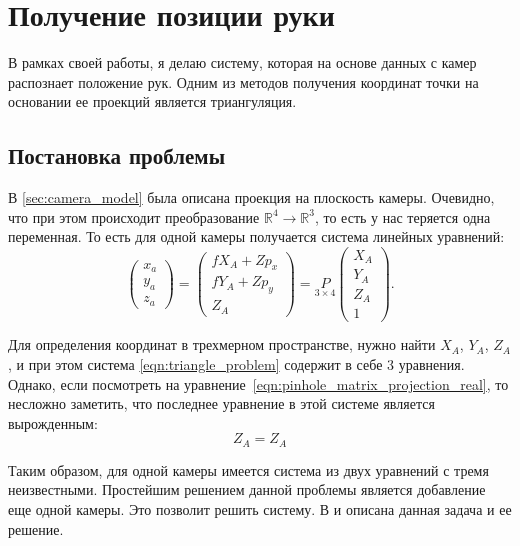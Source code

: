 \documentclass[12pt, a4paper]{article}
\begin{document}
\section{Получение позиции руки}
В рамках своей работы, я делаю систему, которая на основе данных с камер
распознает положение рук. Одним из методов получения координат точки на
основании ее проекций является триангуляция. \subsection{Постановка проблемы} В
\ref{sec:camera_model} была описана проекция на плоскость камеры. Очевидно, что
при этом происходит преобразование $\mathbb{R}^4 \rightarrow \mathbb{R}^3$, то
есть у нас теряется одна переменная. То есть для одной камеры получается
система линейных уравнений:
\begin{equation}
    \begin{pmatrix}
        x_a\\
        y_a\\
        z_a
    \end{pmatrix} = \begin{pmatrix}
        f X_A + Z p_x\\
        f Y_A + Z p_y\\
        Z_A 
    \end{pmatrix} = \underset{3 \times 4}{P} \begin{pmatrix}
        X_A\\
        Y_A\\
        Z_A\\
        1
    \end{pmatrix}.
\label{eqn:triangle_problem}
\end{equation}

Для определения координат в трехмерном пространстве, нужно найти $X_A$, $Y_A$,
$Z_A$, и при этом система \eqref{eqn:triangle_problem} содержит в себе 3
уравнения. Однако, если посмотреть на
уравнение~\eqref{eqn:pinhole_matrix_projection_real}, то несложно заметить, что
последнее уравнение в этой системе является вырожденным:
\begin{equation*}
    Z_A = Z_A
\end{equation*}
\par
Таким образом, для одной камеры имеется система из двух уравнений с тремя
неизвестными. Простейшим решением данной проблемы является добавление еще одной
камеры. Это позволит решить систему. В \cite{multiview_cv} и \cite{dlt_temugeb}
описана данная задача и ее решение. 
\end{document}
